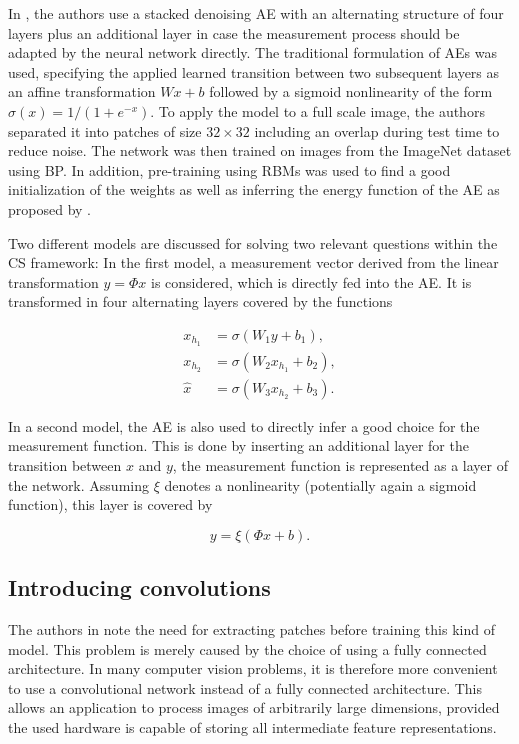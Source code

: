 \documentclass[10pt,twocolumn,a4paper]{article}
\newcommand{\hx}{\hat x}
\newcommand{\Measure}{\Phi}
\begin{document}
In \cite{Mousavi2015}, the authors use a stacked denoising AE with an alternating structure of four layers plus an additional layer in case the measurement process should be adapted by the neural network directly.
The traditional formulation of AEs was used, \ie specifying the applied learned transition between two subsequent layers as an affine transformation $Wx+b$ followed by a sigmoid nonlinearity of the form $\sigma(x) = 1/(1+e^{-x})$.
To apply the model to a full scale image, the authors separated it into patches of size $32 \times 32$ including an overlap during test time to reduce noise.
The network was then trained on images from the ImageNet dataset using BP.
In addition, pre-training using RBMs was used to find a good initialization of the weights as well as inferring the energy function of the AE as proposed by \cite{Kamyshanska2015}.

Two different models are discussed for solving two relevant questions within the CS framework:
In the first model, a measurement vector derived from the linear transformation $y = \Measure x$ is considered, which is directly fed into the AE.
It is transformed in four alternating layers covered by the functions

\begin{align}
    x_{h_1} &= \sigma (W_1 y + b_1),       \label{eq:firstlayer} \\
    x_{h_2} &= \sigma (W_2 x_{h_1} + b_2), \label{eq:secondlayer} \\
    \hx     &= \sigma (W_3 x_{h_2} + b_3). \label{eq:thirdlayer} 
\end{align}

In a second model, the AE is also used to directly infer a good choice for the measurement function.
This is done by inserting an additional layer for the transition between $x$ and $y$, \ie the measurement function is represented as a layer of the network.
Assuming $\xi$ denotes a nonlinearity (potentially again a sigmoid function), this layer is covered by 

\begin{equation}
    y = \xi (\Measure x + b).
\end{equation}

\subsection{Introducing convolutions}

The authors in \cite{Mousavi2015} note the need for extracting patches before training this kind of model.
This problem is merely caused by the choice of using a fully connected architecture.
In many computer vision problems, it is therefore more convenient to use a convolutional network instead of a fully connected architecture.
This allows an application to process images of arbitrarily large dimensions, provided the used hardware is capable of storing all intermediate feature representations.
\end{document}
